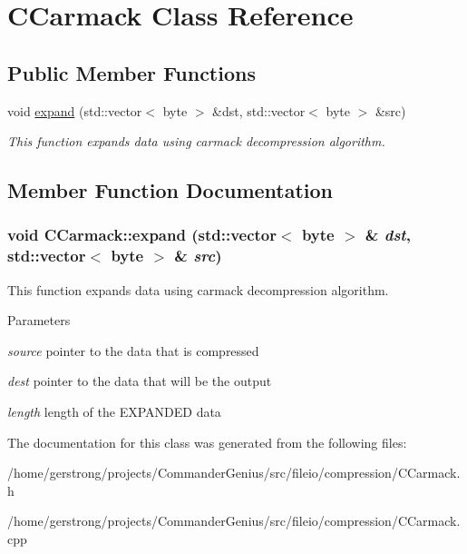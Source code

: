 \hypertarget{class_c_carmack}{
\section{CCarmack Class Reference}
\label{class_c_carmack}
}
\subsection*{Public Member Functions}
\begin{DoxyCompactItemize}
\item 
void \hyperlink{class_c_carmack_a4e007e8f19fe469235c481265892f482}{expand} (std::vector$<$ byte $>$ \&dst, std::vector$<$ byte $>$ \&src)
\begin{DoxyCompactList}\small\item\em This function expands data using carmack decompression algorithm. \item\end{DoxyCompactList}\end{DoxyCompactItemize}


\subsection{Member Function Documentation}
\hypertarget{class_c_carmack_a4e007e8f19fe469235c481265892f482}{
\subsubsection[{expand}]{\setlength{\rightskip}{0pt plus 5cm}void CCarmack::expand (std::vector$<$ byte $>$ \& {\em dst}, \/  std::vector$<$ byte $>$ \& {\em src})}}
\label{class_c_carmack_a4e007e8f19fe469235c481265892f482}


This function expands data using carmack decompression algorithm. 


\begin{DoxyParams}{Parameters}
\item[{\em source}]pointer to the data that is compressed \item[{\em dest}]pointer to the data that will be the output \item[{\em length}]length of the EXPANDED data \end{DoxyParams}


The documentation for this class was generated from the following files:\begin{DoxyCompactItemize}
\item 
/home/gerstrong/projects/CommanderGenius/src/fileio/compression/CCarmack.h\item 
/home/gerstrong/projects/CommanderGenius/src/fileio/compression/CCarmack.cpp\end{DoxyCompactItemize}
